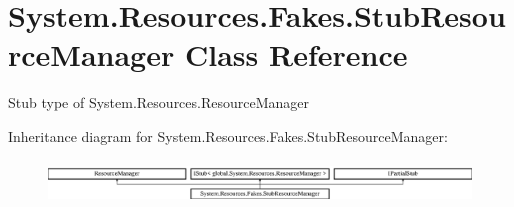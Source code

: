 \hypertarget{class_system_1_1_resources_1_1_fakes_1_1_stub_resource_manager}{\section{System.\-Resources.\-Fakes.\-Stub\-Resource\-Manager Class Reference}
\label{class_system_1_1_resources_1_1_fakes_1_1_stub_resource_manager}
}


Stub type of System.\-Resources.\-Resource\-Manager 


Inheritance diagram for System.\-Resources.\-Fakes.\-Stub\-Resource\-Manager\-:\begin{figure}[H]
\begin{center}
\leavevmode
\includegraphics[height=1.155831cm]{class_system_1_1_resources_1_1_fakes_1_1_stub_resource_manager}
\end{center}
\end{figure}
